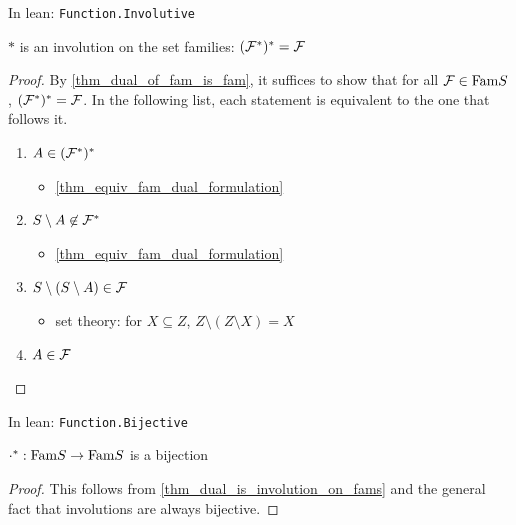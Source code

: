 \begin{leanrmk}
    In lean: \verb|Function.Involutive|
\end{leanrmk}

\begin{theorem}
    \label{thm_dual_is_involution_on_fams}
    $*$ is an involution on the set families: $(\mathcal{F}^*)^* = \mathcal{F}$
\end{theorem}

\begin{proof}
    \leanok{}
    By \cref{thm_dual_of_fam_is_fam}, it suffices to show that for all $\mathcal{F} \in \text{Fam}{S}$, $(\mathcal{F}^*)^* = \mathcal{F}$.
    In the following list, each statement is equivalent to the one that follows it.
    \begin{enumerate}
        \item $A \in (\mathcal{F}^*)^*$
        \begin{itemize}
            \item[--] \cref{thm_equiv_fam_dual_formulation}
        \end{itemize}
        \item $S \setminus A \not\in \mathcal{F}^*$
        \begin{itemize}
            \item[--] \cref{thm_equiv_fam_dual_formulation}
        \end{itemize}
        \item $S \setminus (S \setminus A) \in \mathcal{F}$
        \begin{itemize}
            \item[--] set theory: for $X \subseteq Z$, $Z \setminus (Z \setminus X) = X$
        \end{itemize}
        \item $A \in \mathcal{F}$
    \end{enumerate}
\end{proof}

\begin{leanrmk}
    In lean: \verb|Function.Bijective|
\end{leanrmk}

\begin{theorem}
    \label{thm_dual_is_bijection_on_fams}
    $\cdot^*: \text{Fam}{S} \to \text{Fam}{S}$ is a bijection
\end{theorem}

\begin{proof}
    This follows from \cref{thm_dual_is_involution_on_fams} and the general fact that involutions are always bijective.  
\end{proof}

